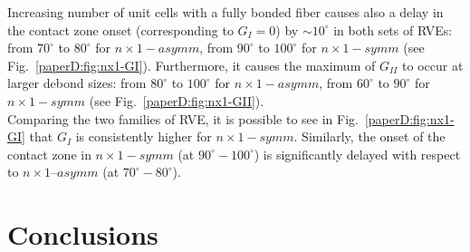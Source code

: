 Increasing number of unit cells with a fully bonded fiber causes also a delay in the contact zone onset (corresponding to $G_{I}=0$) by $\sim10^{\circ}$  in both sets of RVEs: from $70^{\circ}$ to $80^{\circ}$ for $n \times 1−asymm$, from $90^{\circ}$ to $100^{\circ}$ for $n \times 1−symm$ (see Fig.~\ref{paperD:fig:nx1-GI}). Furthermore, it causes the maximum of $G_{II}$ to occur at larger debond sizes: from $80^{\circ}$ to $100^{\circ}$ for $n \times 1−asymm$, from $60^{\circ}$ to $90^{\circ}$ for $n \times 1−symm$ (see Fig.~\ref{paperD:fig:nx1-GII}).\\
Comparing the two families of RVE, it is possible to see in Fig.~\ref{paperD:fig:nx1-GI} that $G_{I}$ is consistently higher for $n \times 1−symm$. Similarly, the onset of the contact zone in $n \times 1−symm$ (at $90^{\circ}−100^{\circ}$) is significantly delayed with respect to $n \times 1 – asymm$ (at $70^{\circ} − 80^{\circ}$). 


\section{Conclusions}

